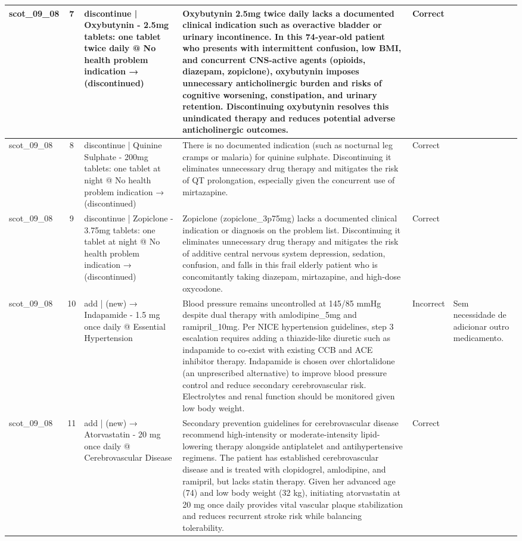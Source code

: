\begin{longtable}{|p{1.45cm}|c|p{3.3cm}|p{6.5cm}|p{1.55cm}|p{2.3cm}|}
\hline
scot\_09\_08 & 7 & discontinue | Oxybutynin - 2.5mg tablets: one tablet twice daily @ No health problem indication → (discontinued) & Oxybutynin 2.5mg twice daily lacks a documented clinical indication such as overactive bladder or urinary incontinence. In this 74-year-old patient who presents with intermittent confusion, low BMI, and concurrent CNS-active agents (opioids, diazepam, zopiclone), oxybutynin imposes unnecessary anticholinergic burden and risks of cognitive worsening, constipation, and urinary retention. Discontinuing oxybutynin resolves this unindicated therapy and reduces potential adverse anticholinergic outcomes. & Correct &  \\
\hline
scot\_09\_08 & 8 & discontinue | Quinine Sulphate - 200mg tablets: one tablet at night @ No health problem indication → (discontinued) & There is no documented indication (such as nocturnal leg cramps or malaria) for quinine sulphate. Discontinuing it eliminates unnecessary drug therapy and mitigates the risk of QT prolongation, especially given the concurrent use of mirtazapine. & Correct &  \\
\hline
scot\_09\_08 & 9 & discontinue | Zopiclone - 3.75mg tablets: one tablet at night @ No health problem indication → (discontinued) & Zopiclone (zopiclone\_3p75mg) lacks a documented clinical indication or diagnosis on the problem list. Discontinuing it eliminates unnecessary drug therapy and mitigates the risk of additive central nervous system depression, sedation, confusion, and falls in this frail elderly patient who is concomitantly taking diazepam, mirtazapine, and high-dose oxycodone. & Correct &  \\
\hline
scot\_09\_08 & 10 & add | (new) → Indapamide - 1.5 mg once daily @ Essential Hypertension & Blood pressure remains uncontrolled at 145/85 mmHg despite dual therapy with amlodipine\_5mg and ramipril\_10mg. Per NICE hypertension guidelines, step 3 escalation requires adding a thiazide-like diuretic such as indapamide to co-exist with existing CCB and ACE inhibitor therapy. Indapamide is chosen over chlortalidone (an unprescribed alternative) to improve blood pressure control and reduce secondary cerebrovascular risk. Electrolytes and renal function should be monitored given low body weight. & Incorrect & Sem necessidade de adicionar outro medicamento. \\
\hline
scot\_09\_08 & 11 & add | (new) → Atorvastatin - 20 mg once daily @ Cerebrovascular Disease & Secondary prevention guidelines for cerebrovascular disease recommend high-intensity or moderate-intensity lipid-lowering therapy alongside antiplatelet and antihypertensive regimens. The patient has established cerebrovascular disease and is treated with clopidogrel, amlodipine, and ramipril, but lacks statin therapy. Given her advanced age (74) and low body weight (32 kg), initiating atorvastatin at 20 mg once daily provides vital vascular plaque stabilization and reduces recurrent stroke risk while balancing tolerability. & Correct &  \\

\end{longtable}
